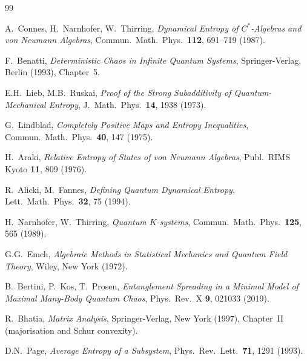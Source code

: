 \documentclass[12pt,a4paper]{article}
\begin{document}
\begin{thebibliography}{99}

A.\ Connes, H.\ Narnhofer, W.\ Thirring,
\emph{Dynamical Entropy of $C^*$-Algebras and von Neumann Algebras},
Commun.\ Math.\ Phys.\ \textbf{112}, 691--719 (1987).

F.\ Benatti,
\emph{Deterministic Chaos in Infinite Quantum Systems},
Springer-Verlag, Berlin (1993), Chapter~5.

E.H.\ Lieb, M.B.\ Ruskai,
\emph{Proof of the Strong Subadditivity of Quantum-Mechanical Entropy},
J.\ Math.\ Phys.\ \textbf{14}, 1938 (1973).

G.\ Lindblad,
\emph{Completely Positive Maps and Entropy Inequalities},
Commun.\ Math.\ Phys.\ \textbf{40}, 147 (1975).

H.\ Araki,
\emph{Relative Entropy of States of von Neumann Algebras},
Publ.\ RIMS Kyoto \textbf{11}, 809 (1976).

R.\ Alicki, M.\ Fannes,
\emph{Defining Quantum Dynamical Entropy},
Lett.\ Math.\ Phys.\ \textbf{32}, 75 (1994).

H.\ Narnhofer, W.\ Thirring,
\emph{Quantum $K$-systems},
Commun.\ Math.\ Phys.\ \textbf{125}, 565 (1989).

G.G.\ Emch,
\emph{Algebraic Methods in Statistical Mechanics and Quantum Field Theory},
Wiley, New York (1972).

B.\ Bertini, P.\ Kos, T.\ Prosen,
\emph{Entanglement Spreading in a Minimal Model of Maximal Many-Body Quantum Chaos},
Phys.\ Rev.\ X \textbf{9}, 021033 (2019).

R.\ Bhatia,
\emph{Matrix Analysis},
Springer-Verlag, New York (1997), Chapter~II (majorisation and Schur convexity).

D.N.\ Page,
\emph{Average Entropy of a Subsystem},
Phys.\ Rev.\ Lett.\ \textbf{71}, 1291 (1993).

\end{thebibliography}
\end{document}
